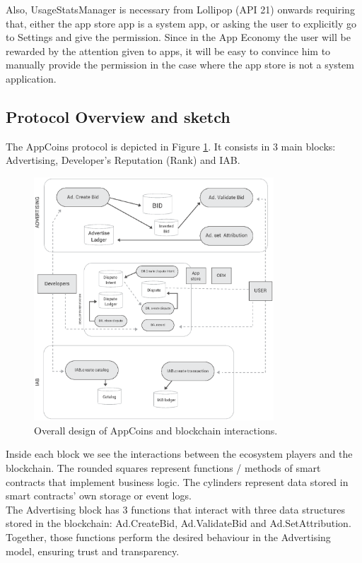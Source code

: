 Also, UsageStatsManager is necessary from Lollipop (API 21) onwards requiring that, either the app 
store app is a system app, or asking the user to explicitly go to Settings and give the permission. Since 
in the App Economy the user will be rewarded by the attention given to apps, it will be easy to convince 
him to manually provide the permission in the case where the app store is not a system application.


\subsection{Protocol Overview and sketch}


The AppCoins protocol is depicted in Figure \ref{fig:design}. It consists in 3 main blocks: Advertising, 
Developer's Reputation (Rank) and IAB.

\begin{figure}[!ht]
\centering
\includegraphics[width=0.8\textwidth]{diagrams/design.eps}
\caption{Overall design of AppCoins and blockchain interactions.}
\label{fig:design}
\end{figure}

Inside each block we see the interactions between the ecosystem players and the blockchain. The 
rounded squares represent functions / methods of smart contracts that implement business logic. The 
cylinders represent data stored in smart contracts' own storage or event logs. \\

The Advertising block has 3 functions that interact with three data structures stored in the blockchain: 
\textsf{Ad.CreateBid}, \textsf{Ad.ValidateBid} and \textsf{Ad.SetAttribution}. Together, those functions 
perform the desired behaviour in the Advertising model, ensuring trust and transparency.

